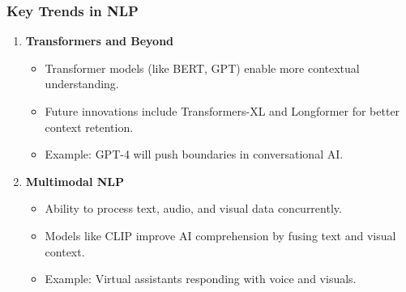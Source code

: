 \documentclass[aspectratio=169]{beamer}
\begin{document}
\begin{frame}[fragile]
    \frametitle{Key Trends in NLP}
    \begin{enumerate}
        \item \textbf{Transformers and Beyond}
            \begin{itemize}
                \item Transformer models (like BERT, GPT) enable more contextual understanding.
                \item Future innovations include Transformers-XL and Longformer for better context retention.
                \item Example: GPT-4 will push boundaries in conversational AI.
            \end{itemize}
        \item \textbf{Multimodal NLP}
            \begin{itemize}
                \item Ability to process text, audio, and visual data concurrently.
                \item Models like CLIP improve AI comprehension by fusing text and visual context.
                \item Example: Virtual assistants responding with voice and visuals.
            \end{itemize}
    \end{enumerate}
\end{frame}
\end{document}
